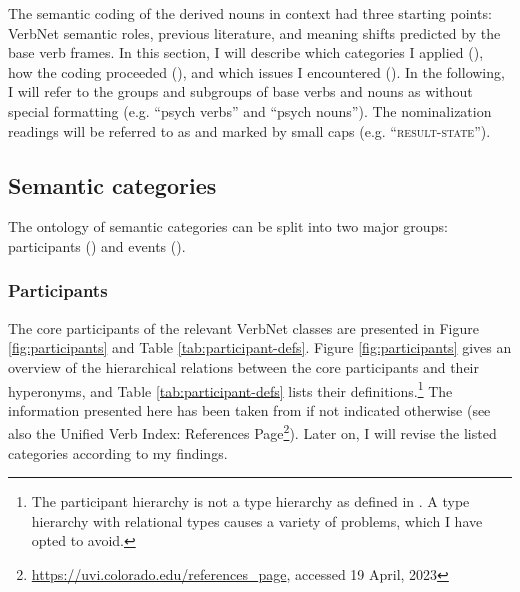 The semantic coding of the derived nouns in context had three starting points: VerbNet semantic roles, previous literature, and meaning shifts predicted by the base verb frames.
In this section, I will describe which categories I applied (), how the coding proceeded (), and which issues I encountered ().
In the following, I will refer to the groups and subgroups of base verbs and nouns as  without special formatting (e.g. ``psych verbs'' and ``psych nouns''). The nominalization readings will be referred to as  and marked by small caps (e.g. ``\textsc{result-state}''). 

\subsection{Semantic categories}
\label{sec:meth-Nsem-semcat}

The ontology of semantic categories can be split into two major groups: participants () and events ().  

\subsubsection{Participants} 
\label{sec:meth-Nsem-semcat-part}

The core participants of the relevant VerbNet classes are presented in Figure \ref{fig:participants} and Table \ref{tab:participant-defs}. 
Figure \ref{fig:participants} gives an overview of the hierarchical relations between the core participants and their hyperonyms, and Table \ref{tab:participant-defs} lists their definitions.\footnote{The participant hierarchy is not a type hierarchy as defined in . A type hierarchy with relational types causes a variety of problems, which I have opted to avoid.} 
The information presented here has been taken from \citet{Palmer.2017} if not indicated otherwise (see also the Unified Verb Index: References Page\footnote{\url{https://uvi.colorado.edu/references_page}, accessed 19 April, 2023}).
Later on, I will revise the listed categories according to my findings. 


